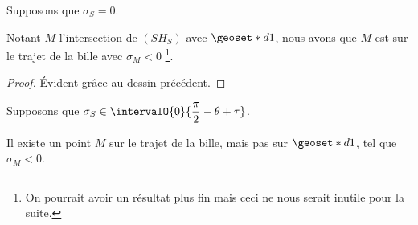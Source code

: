 \begin{fact} \label{ortho-rebond}
	Supposons que $\sigma_S = 0$.
	
	\medskip
	
	Notant $M$ l'intersection de $(SH_S)$ avec $\geoset*{d}{1}$, nous avons que $M$ est sur le trajet de la bille avec $\sigma_M < 0$
	\footnote{
		On pourrait avoir un résultat plus fin mais ceci ne nous serait inutile pour la suite.
	}.
\end{fact}

\begin{proof}
	Évident grâce au dessin précédent.
\end{proof}


\medskip


\begin{fact} \label{deux-rebonds-vers-F}
	Supposons que $\sigma_S \in \intervalO{0}{\dfrac{\pi}{2} - \theta + \tau}$.
	
	\medskip
	
	Il existe un point $M$ sur le trajet de la bille, mais pas sur $\geoset*{d}{1}$, tel que $\sigma_M  < 0$.
\end{fact}

